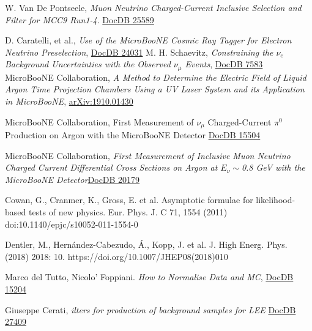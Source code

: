 \documentclass[a4paper]{article}
\begin{document}
\begin{thebibliography}{}
W. Van De Pontseele, \emph{Muon Neutrino Charged-Current Inclusive Selection and Filter for MCC9 Run1-4}. \href{https://microboone-docdb.fnal.gov/cgi-bin/private/ShowDocument?docid=25589}{DocDB 25589}

D. Caratelli, et al., \emph{Use of the MicroBooNE Cosmic Ray Tagger for Electron Neutrino Preselection}, \href{https://microboone-docdb.fnal.gov/cgi-bin/private/RetrieveFile?docid=24031&filename=CRTPACTechnote.pdf&version=1}{DocDB 24031}
M. H. Schaevitz, \emph{Constraining the $\nu_e$ Background Uncertainties with the Observed $\nu_\mu$ Events}, \href{https://microboone-docdb.fnal.gov/cgi-bin/private/RetrieveFile?docid=7583}{DocDB 7583}
MicroBooNE Collaboration, \emph{A Method to Determine the Electric Field of Liquid Argon Time Projection Chambers Using a UV Laser System and its Application in MicroBooNE}, \href{https://arxiv.org/abs/1910.01430}{arXiv:1910.01430}

 MicroBooNE Collaboration, First Measurement of $\nu_\mu$ Charged-Current $\pi^0$ Production on Argon with the MicroBooNE Detector \href{https://microboone-docdb.fnal.gov/cgi-bin/private/RetrieveFile?docid=15504&filename=MicroBooNE_CCPizero_Run1_FinalVersion.pdf&version=17}{DocDB 15504}

 MicroBooNE Collaboration, \emph{First Measurement of Inclusive Muon Neutrino Charged Current Differential Cross Sections on Argon at $E_\nu \sim$0.8 GeV with the MicroBooNE Detector}\href{https://microboone-docdb.fnal.gov/cgi-bin/private/RetrieveFile?docid=20179&filename=ccinclusive_paper_prl_v4.9.pdf&version=19}{DocDB 20179}


Cowan, G., Cranmer, K., Gross, E. et al. Asymptotic formulae for likelihood-based tests of new physics. Eur. Phys. J. C 71, 1554 (2011) doi:10.1140/epjc/s10052-011-1554-0

Dentler, M., Hernández-Cabezudo, Á., Kopp, J. et al. J. High Energ. Phys. (2018) 2018: 10. https://doi.org/10.1007/JHEP08(2018)010

Marco del Tutto, Nicolo' Foppiani. \emph{How to Normalise Data and MC}, \href{https://microboone-docdb.fnal.gov/cgi-bin/private/ShowDocument?docid=15204}{DocDB 15204}

Giuseppe Cerati, \emph{ilters for production of background samples for LEE} \href{https://microboone-docdb.fnal.gov/cgi-bin/private/ShowDocument?docid=27409}{DocDB 27409}


\end{thebibliography}
\end{document}
